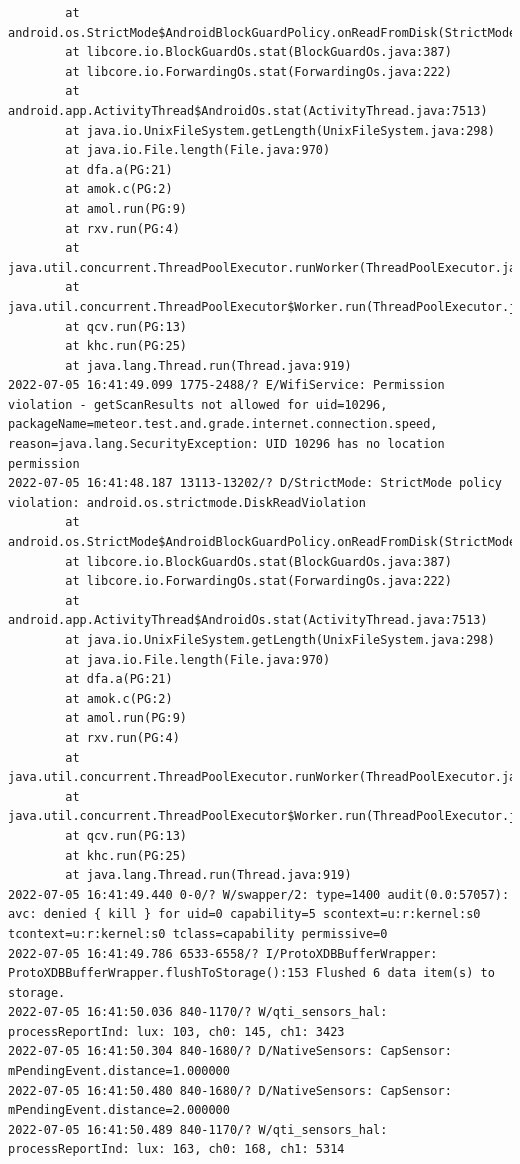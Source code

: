 \documentclass[a4paper,12pt]{book}
\begin{document}
\begin{lstlisting}
        at android.os.StrictMode$AndroidBlockGuardPolicy.onReadFromDisk(StrictMode.java:1571)
        at libcore.io.BlockGuardOs.stat(BlockGuardOs.java:387)
        at libcore.io.ForwardingOs.stat(ForwardingOs.java:222)
        at android.app.ActivityThread$AndroidOs.stat(ActivityThread.java:7513)
        at java.io.UnixFileSystem.getLength(UnixFileSystem.java:298)
        at java.io.File.length(File.java:970)
        at dfa.a(PG:21)
        at amok.c(PG:2)
        at amol.run(PG:9)
        at rxv.run(PG:4)
        at java.util.concurrent.ThreadPoolExecutor.runWorker(ThreadPoolExecutor.java:1167)
        at java.util.concurrent.ThreadPoolExecutor$Worker.run(ThreadPoolExecutor.java:641)
        at qcv.run(PG:13)
        at khc.run(PG:25)
        at java.lang.Thread.run(Thread.java:919)
2022-07-05 16:41:49.099 1775-2488/? E/WifiService: Permission violation - getScanResults not allowed for uid=10296, packageName=meteor.test.and.grade.internet.connection.speed, reason=java.lang.SecurityException: UID 10296 has no location permission
2022-07-05 16:41:48.187 13113-13202/? D/StrictMode: StrictMode policy violation: android.os.strictmode.DiskReadViolation
        at android.os.StrictMode$AndroidBlockGuardPolicy.onReadFromDisk(StrictMode.java:1571)
        at libcore.io.BlockGuardOs.stat(BlockGuardOs.java:387)
        at libcore.io.ForwardingOs.stat(ForwardingOs.java:222)
        at android.app.ActivityThread$AndroidOs.stat(ActivityThread.java:7513)
        at java.io.UnixFileSystem.getLength(UnixFileSystem.java:298)
        at java.io.File.length(File.java:970)
        at dfa.a(PG:21)
        at amok.c(PG:2)
        at amol.run(PG:9)
        at rxv.run(PG:4)
        at java.util.concurrent.ThreadPoolExecutor.runWorker(ThreadPoolExecutor.java:1167)
        at java.util.concurrent.ThreadPoolExecutor$Worker.run(ThreadPoolExecutor.java:641)
        at qcv.run(PG:13)
        at khc.run(PG:25)
        at java.lang.Thread.run(Thread.java:919)
2022-07-05 16:41:49.440 0-0/? W/swapper/2: type=1400 audit(0.0:57057): avc: denied { kill } for uid=0 capability=5 scontext=u:r:kernel:s0 tcontext=u:r:kernel:s0 tclass=capability permissive=0
2022-07-05 16:41:49.786 6533-6558/? I/ProtoXDBBufferWrapper: ProtoXDBBufferWrapper.flushToStorage():153 Flushed 6 data item(s) to storage.
2022-07-05 16:41:50.036 840-1170/? W/qti_sensors_hal: processReportInd: lux: 103, ch0: 145, ch1: 3423
2022-07-05 16:41:50.304 840-1680/? D/NativeSensors: CapSensor:  mPendingEvent.distance=1.000000
2022-07-05 16:41:50.480 840-1680/? D/NativeSensors: CapSensor:  mPendingEvent.distance=2.000000
2022-07-05 16:41:50.489 840-1170/? W/qti_sensors_hal: processReportInd: lux: 163, ch0: 168, ch1: 5314

\end{lstlisting}
\end{document}
